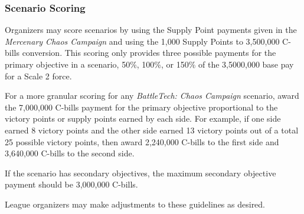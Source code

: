 \subsubsection{Scenario Scoring}

Organizers may score scenarios by using the Supply Point payments given in the \emph{Mercenary Chaos Campaign} and using the 1,000 Supply Points to 3,500,000 C-bills conversion.
This scoring only provides three possible payments for the primary objective in a scenario, 50\%, 100\%, or 150\% of the 3,5000,000 base pay for a Scale 2 force.

For a more granular scoring for any \emph{BattleTech: Chaos Campaign} scenario, award the 7,000,000 C-bills payment for the primary objective proportional to the victory points or supply points earned by each side.
For example, if one side earned 8 victory points and the other side earned 13 victory points out of a total 25 possible victory points, then award 2,240,000 C-bills to the first side and 3,640,000 C-bills to the second side.

If the scenario has secondary objectives, the maximum secondary objective payment should be 3,000,000 C-bills.

League organizers may make adjustments to these guidelines as desired.

